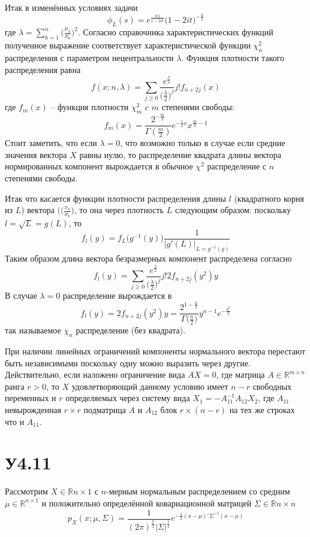 \documentclass[a4paper]{article}
\newcommand{\Real}{\mathbb{R}}
\begin{document}
Итак в изменённых условиях задачи 
\[\phi_L(s) = e^\frac{it \lambda}{1 - 2it} \bigl(1 - 2it\bigr)^{-\frac{n}{2}}\]
где $\lambda = \sum_{k=1}^n \bigl(\frac{\mu_k}{\sigma_k}\bigr)^2$. Согласно справочника
характеристических функций полученное выражение соответствует характеристической
функции $\chi^2_n$ распределения с параметром нецентральности $\lambda$. Функция
плотности такого распределения равна
\[
f(x;n,\lambda)
= \sum_{j\geq 0} \frac{e^\frac{\lambda}{2}}{ \bigl(\frac{\lambda}{2}\bigr)^j}{j!} f_{n+2j}(x)
\]
где $f_m(x)$ -- функция плотности $\chi^2_m$ c $m$ степенями свободы:
\[f_m(x) = \frac{2^{-\frac{m}{2}}}{\Gamma(\frac{m}{2})} e^{-\frac{1}{2}x} x^{\frac{m}{2}-1}\]
Стоит заметить, что если $\lambda = 0$, что возможно только в случае если средние
значения вектора $X$ равны нулю, то распределение квадрата длины вектора
нормированных компонент вырождается в обычное $\chi^2$ распределение с $n$ степенями
свободы.

Итак что касается функции плотности распределения длины $l$ (квадратного корня из $L$)
вектора $(\bigl(\frac{x_k}{\sigma_k}\bigr)$, то она через плотность $L$ следующим
образом: поскольку $l = \sqrt{L} = g(L)$, то
\[f_l(y) = f_L\bigl(g^{-1}(y)\bigr) \frac{1}{\bigl\lvert g'(L)\bigr\rvert_{L=g^{-1}(y)}}\]
Таким образом длина вектора безразмерных компонент распределена согласно
\[f_l(y) = \sum_{j\geq 0} \frac{e^\frac{\lambda}{2}}{ \bigl(\frac{\lambda}{2}\bigr)^j}{j!} 2 f_{n+2j}(y^2) y\]
В случае $\lambda = 0$ распределение вырождается в 
\[
f_l(y)
= 2 f_{n+2j}(y^2) y
= \frac{2^{1-\frac{n}{2}}}{\Gamma\bigl(\frac{n}{2}\bigr)} y^{n-1} e^{-\frac{y^2}{2}}
\]
так называемое $\chi_n$ распределение (без квадрата).

При наличии линейных ограничений компоненты нормального вектора перестают быть
независимыми поскольку одну можно выразить через другие. Действительно, если наложено
ограничение вида $AX = 0$, где матрица $A\in \Real^{m\times n}$ ранга $r>0$, то
$X$ удовлетворяющий данному условию имеет $n-r$ свободных переменных и $r$
определяемых через систему вида $X_1 = -A_{11}^{-1} A_{12} X_2$, где $A_{11}$
невырожденная $r\times r$ подматрица $A$ и $A_{12}$ блок $r\times (n-r)$ на тех же
строках что и $A_{11}$.


\section{У4.11} %
\label{sec:problem_4_11}

Рассмотрим $X\in \Real{n\times 1}$ с $n$-мерным нормальным распределением со
средним $\mu\in \Real^{n\times 1}$ и положительно определённой ковариационной
матрицей $\Sigma \in \Real{n\times n}$
\[
p_X(x;\mu,\Sigma)
= \frac{1}{(2\pi)^\frac{n}{2} \lvert \Sigma \rvert^\frac{1}{2}}
	e^{-\frac{1}{2}(x-\mu)'\Sigma^{-1}(x-\mu)}
\]
\end{document}
